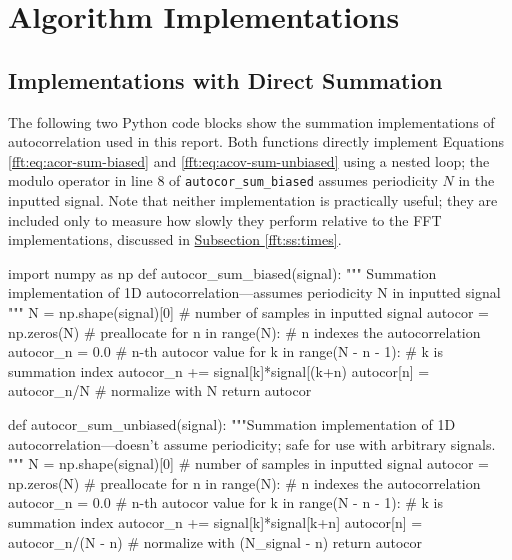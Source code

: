\documentclass[11pt, a4paper]{article}
\begin{document}
\section{Algorithm Implementations}  \label{fft:s:solution}

\subsection{Implementations with Direct Summation}
The following two Python code blocks show the summation implementations of autocorrelation used in this report. Both functions directly implement Equations \ref{fft:eq:acor-sum-biased} and \ref{fft:eq:acov-sum-unbiased} using a nested loop; the modulo operator in line 8 of \texttt{autocor\_sum\_biased} assumes periodicity $ N $ in the inputted signal. Note that neither implementation is practically useful; they are included only to measure how slowly they perform relative to the FFT implementations, discussed in \hyperref[fft:ss:times]{Subsection \ref{fft:ss:times}}. 
\begin{python}
import numpy as np
def autocor_sum_biased(signal):
    """ Summation implementation of 1D autocorrelation---assumes periodicity N in inputted signal """
    N = np.shape(signal)[0]  # number of samples in inputted signal
    autocor = np.zeros(N)  # preallocate
    for n in range(N):  # n indexes the autocorrelation
        autocor_n = 0.0  # n-th autocor value
        for k in range(N - n - 1):  # k is summation index
            autocor_n += signal[k]*signal[(k+n) %
        autocor[n] = autocor_n/N  # normalize with N
    return autocor
\end{python}

\begin{python}
def autocor_sum_unbiased(signal):
    """Summation implementation of 1D autocorrelation---doesn't assume periodicity; safe for use with arbitrary signals. """
    N = np.shape(signal)[0]  # number of samples in inputted signal
    autocor = np.zeros(N) # preallocate
    for n in range(N):  # n indexes the autocorrelation
        autocor_n = 0.0  # n-th autocor value
        for k in range(N - n - 1):  # k is summation index
            autocor_n += signal[k]*signal[k+n]
        autocor[n] = autocor_n/(N - n)  # normalize with (N_signal - n)
    return autocor
\end{python}
\end{document}
